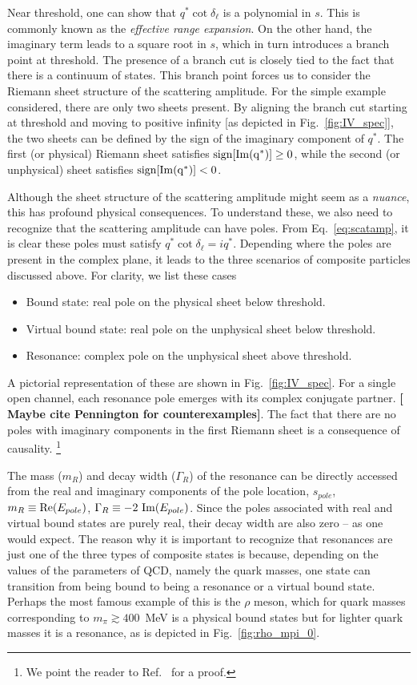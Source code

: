 \documentclass{iopart}
\newcommand{\raul}[0]{\bf \color{blue} }
\newcommand{\sign}{\rm{sign}}
\theoremstyle{definition}
\begin{document}
{Near threshold, one can show that $q^*\cot\delta_{\ell}$ is a polynomial in $s$. This is commonly known as the \emph{effective range expansion}. On the other hand, the imaginary term leads to a square root in $s$, which in turn introduces a branch point at threshold. The presence of a branch cut is closely tied to the fact that there is a continuum of states. This branch point forces us to consider the Riemann sheet structure of the scattering amplitude. For the simple example considered, there are only two sheets present. By aligning the branch cut starting at threshold and moving to positive infinity [as depicted in Fig.~\ref{fig:IV_spec}], the two sheets can be defined by the sign of the imaginary component of $q^*$. The first (or physical) Riemann sheet satisfies $\sign[{\rm Im} (q^*)]\geq0$, while the second (or unphysical) sheet satisfies $\sign[{\rm Im} (q^*)]<0$. 

Although the sheet structure of the scattering amplitude might seem as a \emph{nuance}, this has profound physical consequences. To understand these, we also need to recognize that the scattering amplitude can have poles. From Eq.~\ref{eq:scatamp}, it is clear these poles must satisfy $q^*\cot\delta_{\ell}=iq^*$. Depending where the poles are present in the complex plane, it leads to the three scenarios of composite particles discussed above. For clarity, we list these cases
\begin{itemize}
  \item Bound state: real pole on the physical sheet below threshold.
  \item Virtual bound state: real pole on the unphysical sheet below threshold.
  \item Resonance: complex pole on the unphysical sheet above threshold. 
\end{itemize}
A pictorial representation of these are shown in Fig.~\ref{fig:IV_spec}. For a single open channel, each resonance pole emerges with its complex conjugate partner. {\raul[ Maybe cite Pennington for counterexamples]}. The fact that there are no poles with imaginary components in the first Riemann sheet is a consequence of causality.
\footnote{We point the reader to Ref.~\cite{Gribov:1186219} for a proof.}





 The mass ($m_R$) and decay width ($\Gamma_R$) of the resonance can be directly accessed from the real and imaginary components of the pole location, $s_{pole}$, $m_R\equiv {\rm Re}({E_{pole}})$, $\Gamma_R\equiv -2~{\rm Im}({E_{pole}})$. Since the poles associated with real and virtual bound states are purely real, their decay width are also zero -- as one would expect. The reason why it is important to recognize that resonances are just one of the three types of composite states is because, depending on the values of the parameters of QCD, namely the quark masses, one state can transition from being bound to being a resonance or a virtual bound state. Perhaps the most famous example of this is the $\rho$ meson, which for quark masses corresponding to $m_\pi \gtrsim 400$~MeV is a physical bound states but for lighter quark masses it is a resonance, as is depicted in Fig.~\ref{fig:rho_mpi_0}. 
 
}
\end{document}
